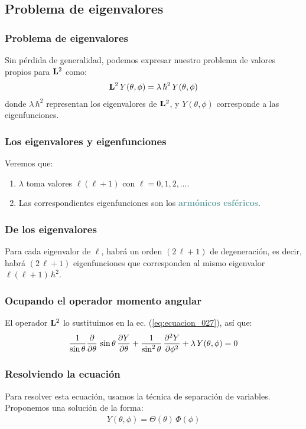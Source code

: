 \documentclass[12pt]{beamer}
\begin{document}
\subsection{Problema de eigenvalores}

\begin{frame}
\frametitle{Problema de eigenvalores}
Sin pérdida de generalidad, podemos expresar nuestro problema de valores propios para $\vb{L}^{2}$ como:
\pause
\begin{align}
\vb{L}^{2} \, Y(\theta, \phi) = \lambda \, \hbar^{2} \, Y(\theta, \phi)
\label{eq:ecuacion_027}
\end{align}
\pause
donde $\lambda \, \hbar^{2}$ representan los eigenvalores de $\vb{L}^{2}$, \pause y $Y(\theta, \phi)$ corresponde a las eigenfunciones. 
\end{frame}
\begin{frame}
\frametitle{Los eigenvalores y eigenfunciones}
Veremos que:
\pause
{}
\begin{enumerate}[<+->]
\item $\lambda$ toma valores $\ell (\ell + 1)$ con $\ell = 0, 1, 2, \ldots$.
\item Las correspondientes eigenfunciones son los \textbf{\textcolor{cadetblue}{armónicos esféricos}}.
\end{enumerate}
\end{frame}
\begin{frame}
\frametitle{De los eigenvalores}
Para cada eigenvalor de $\ell$, habrá un orden $(2 \, \ell + 1)$ de degeneración, \pause es decir, habrá $(2 \, \ell + 1)$ eigenfunciones que corresponden al mismo eigenvalor $\ell (\ell + 1) \, \hbar^{2}$.
\end{frame}
\begin{frame}
\frametitle{Ocupando el operador momento angular}
El operador $\vb{L}^{2}$ lo sustituimos en la ec. (\ref{eq:ecuacion_027}), así que:
\pause
\begin{align}
\dfrac{1}{\sin \theta} \pdv{\theta} \, \sin \theta \, \pdv{Y}{\theta} + \dfrac{1}{\sin^{2} \theta} \, \pdv[2]{Y}{\phi} + \lambda \, Y(\theta, \phi) = 0
\end{align}
\end{frame}
\begin{frame}
\frametitle{Resolviendo la ecuación}
Para resolver esta ecuación, usamos la técnica de separación de variables.
\\
\bigskip
\pause
Proponemos una solución de la forma:
\pause
\begin{align}
Y(\theta, \phi) = \Theta(\theta) \, \Phi(\phi)
\label{eq:ecuacion_029}
\end{align}
\end{frame}
\end{document}

